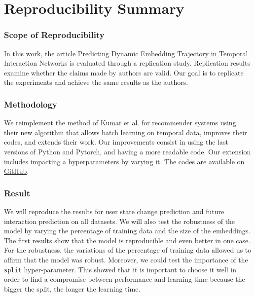 

\newcommand{\amel}[1]{{\color{orange} #1}} 

\section*{Reproducibility Summary}


\subsubsection{Scope of Reproducibility}

In this work, the article Predicting Dynamic Embedding Trajectory in Temporal Interaction Networks \supercite{kumar2019predicting}  is evaluated through a replication study. Replication results examine whether the claims made by authors are valid. Our goal is to replicate the experiments and achieve the same results as the authors.

\subsubsection{Methodology}

We reimplement the method of Kumar et al.\supercite{kumar2019predicting} for recommender systems using their new algorithm that allows batch learning on temporal data, improves their codes, and extends their work. Our improvements consist in using the last versions of Python and  Pytorch, and having a more readable code. Our extension includes impacting a hyperparameters by varying it. The codes are available on \href{https://github.com/ComplexNetTSP/JODIE}{GitHub}. 

\subsubsection{Result}

We will reproduce the results for user state change prediction and future interaction prediction on all datasets. We will also test the robustness of the model by varying the percentage of training data and the size of the embeddings. The first results show that the model is reproducible and even better in one case. For the robustness, the variations of the percentage of training data allowed us to affirm that the model was robust. Moreover, we could test the importance of the \texttt{split} hyper-parameter. This showed that it is important to choose it well in order to find a compromise between performance and learning time because the bigger the split, the longer the learning time.


